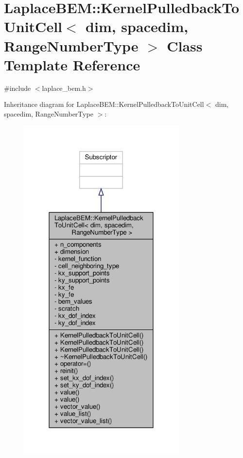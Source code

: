 \hypertarget{classLaplaceBEM_1_1KernelPulledbackToUnitCell}{}\section{Laplace\+B\+EM\+:\+:Kernel\+Pulledback\+To\+Unit\+Cell$<$ dim, spacedim, Range\+Number\+Type $>$ Class Template Reference}
\label{classLaplaceBEM_1_1KernelPulledbackToUnitCell}


{\ttfamily \#include $<$laplace\+\_\+bem.\+h$>$}



Inheritance diagram for Laplace\+B\+EM\+:\+:Kernel\+Pulledback\+To\+Unit\+Cell$<$ dim, spacedim, Range\+Number\+Type $>$\+:\nopagebreak
\begin{figure}[H]
\begin{center}
\leavevmode
\includegraphics[width=240pt]{classLaplaceBEM_1_1KernelPulledbackToUnitCell__inherit__graph}
\end{center}
\end{figure}


